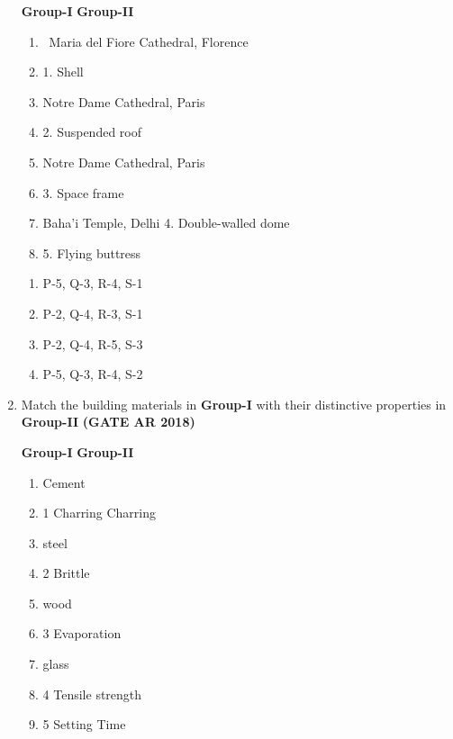 \documentclass[journal,15pt,onecolumn]{IEEEtran}
\theoremstyle{remark}
\begin{document}
\begin{enumerate}
\vspace{0.15cm}

\hspace{3cm}  \textbf{Group-I}\hspace{8cm} \textbf{Group-II} \\
\vspace{0.15cm}


\begin{enumerate}
    \item     \ Maria del Fiore Cathedral, Florence  \item   1. Shell
    \item    Notre Dame Cathedral, Paris  \item    2. Suspended roof
    \item     Notre Dame Cathedral, Paris  \item    3. Space frame
    \item    Baha'i Temple, Delhi 4. Double-walled dome \item    5. Flying buttress
\end{enumerate}

 
\begin{enumerate}
\item    P-5, Q-3, R-4, S-1
\item    P-2, Q-4, R-3, S-1 
\item    P-2, Q-4, R-5, S-3 
\item    P-5, Q-3, R-4, S-2 
\end{enumerate}


\vspace{0.5cm}

\item 
Match the building materials in \textbf{Group-I} with their distinctive properties in \textbf{Group-II}\hfill \textbf{ (GATE AR 2018)}

\vspace{4pt}

\vspace{4pt}

\hspace{3cm}  \textbf{Group-I}\hspace{8cm} \textbf{Group-II} 
\begin{enumerate}

\item     Cement    \item  1 Charring Charring
\item     steel     \item  2 Brittle
\item     wood      \item  3 Evaporation 
\item     glass     \item  4 Tensile strength 
                   \item  5  Setting Time   
\end{enumerate}


\end{enumerate}
\end{document}
